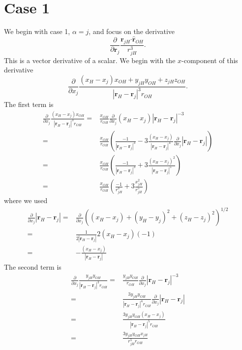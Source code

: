 \documentclass{article}
\newcommand{\vect}[1]{\boldsymbol{\mathbf{#1}}}
\begin{document}
\section{Case 1}
We begin with case 1, $\alpha=j$, and focus on the derivative
\begin{equation}
\frac{\partial}{\partial \vect r_j} \frac{\vect{r}_{jH}\vect\cdot\vect{\hat r}_{OH} }{r_{jH}^3}.
\end{equation}
This is a vector derivative of a scalar.
We begin with the $x$-component of this derivative
\begin{equation}\label{eq:xcomp}
\frac{\partial}{\partial x_j} \frac{(x_H-x_j)x_{OH}+y_{jH}y_{OH} + z_{jH}z_{OH}}{|\vect r_H-\vect r_j|^3r_{OH}}. 
\end{equation}
The first term is
\begin{align*}
\frac{\partial}{\partial x_j} \frac{(x_H-x_j)x_{OH}}{|\vect r_H-\vect r_j|^3r_{OH}} =& \frac{x_{OH}}{r_{OH}} \frac{\partial}{\partial x_j} (x_H-x_j)|\vect r_H-\vect r_j|^{-3}\\
=& \frac{x_{OH}}{r_{OH}} \left( \frac{-1}{|\vect r_H-\vect r_j|^3} -3 \frac{(x_H-x_j)}{|\vect r_H-\vect r_j|^4} \frac{\partial}{\partial x_j}|\vect r_H-\vect r_j|\right)  \\
=& \frac{x_{OH}}{r_{OH}} \left( \frac{-1}{|\vect r_H-\vect r_j|^3} +3 \frac{(x_H-x_j)^2}{|\vect r_H-\vect r_j|^5} \right) \\
=& \frac{x_{OH}}{r_{OH}} \left( \frac{-1}{r_{jH}^3} +3 \frac{x_{jH}^2}{r_{jH}^5} \right)
\end{align*}
where we used 
\begin{align}
\frac{\partial}{\partial x_j}|\vect r_H-\vect r_j| =& \frac{\partial}{\partial x_j}\left((x_H-x_j)+(y_H-y_j)^2+(z_H-z_j)^2\right)^{1/2} \\
=& \frac{1}{2|\vect r_H-\vect r_j|}2(x_H-x_j)(-1) \\
=& -\frac{(x_H-x_j)}{|\vect r_H-\vect r_j|}
\end{align}
The second term is 
\begin{align*}
\frac{\partial}{\partial x_j} \frac{y_{jH}y_{OH}}{|\vect r_H-\vect r_j|^3r_{OH}} =&\frac{y_{jH}y_{OH}}{r_{OH}} \frac{\partial}{\partial x_j} |\vect r_H-\vect r_j|^{-3} \\
=& \frac{3y_{jH}y_{OH}}{|\vect r_H-\vect r_j|^4r_{OH}} \frac{\partial}{\partial x_j} |\vect r_H-\vect r_j| \\
=& \frac{3y_{jH}y_{OH}(x_H-x_j)}{|\vect r_H-\vect r_j|^5r_{OH}} \\
=& \frac{3y_{jH}y_{OH}x_{jH}}{r_{jH}^5r_{OH}}
\end{align*}
\end{document}
